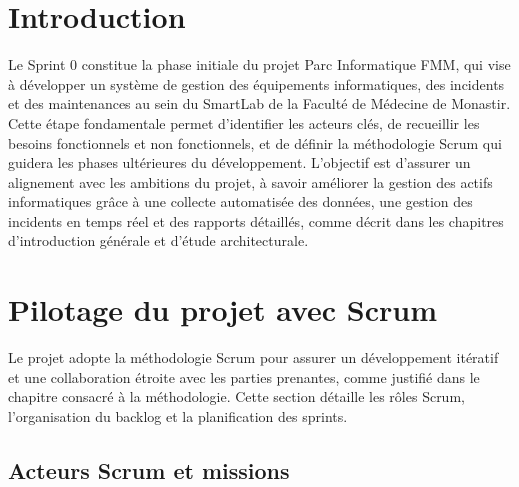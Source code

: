 \vspace{1cm}
\label{chap:sprint0}
\setcounter{chapter}{4}
\setcounter{section}{0}


\localtableofcontents
\newpage
\pagebreak
\section*{Introduction}
\label{sec:intro_sprint0}

Le Sprint 0 constitue la phase initiale du projet Parc Informatique FMM, qui vise à développer un système de gestion des équipements informatiques, des incidents et des maintenances au sein du SmartLab de la Faculté de Médecine de Monastir. Cette étape fondamentale permet d’identifier les acteurs clés, de recueillir les besoins fonctionnels et non fonctionnels, et de définir la méthodologie Scrum qui guidera les phases ultérieures du développement. L’objectif est d’assurer un alignement avec les ambitions du projet, à savoir améliorer la gestion des actifs informatiques grâce à une collecte automatisée des données, une gestion des incidents en temps réel et des rapports détaillés, comme décrit dans les chapitres d’introduction générale et d’étude architecturale.

\section{Pilotage du projet avec Scrum}
\label{sec:gestion_scrum}

Le projet adopte la méthodologie Scrum pour assurer un développement itératif et une collaboration étroite avec les parties prenantes, comme justifié dans le chapitre consacré à la méthodologie. Cette section détaille les rôles Scrum, l’organisation du backlog et la planification des sprints.

\subsection{Acteurs Scrum et missions}
\label{subsec:roles_scrum}

